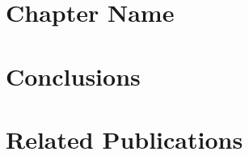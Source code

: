 \documentclass[11pt]{book}
\begin{document}
\chapter{Chapter Name}
\label{ch:chap4}



\chapter{Conclusions}
\label{ch:conc}



\chapter*{Related Publications}
\label{ch:relatedPubs}




 
\end{document}
